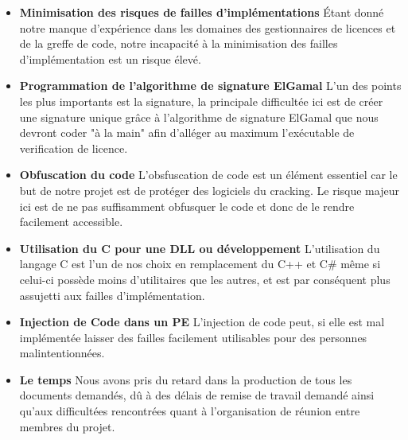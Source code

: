 \begin{itemize}
	\item \textbf{Minimisation des risques de failles d'implémentations} \newline
	Étant donné notre manque d'expérience dans les domaines des gestionnaires de licences
	et de la greffe de code, notre incapacité à la minimisation des failles d'implémentation est un risque élevé.\newline
	
	\item \textbf{Programmation de l'algorithme de signature ElGamal} \newline
	L'un des points les plus importants est la signature, la principale difficultée ici est de créer une signature unique grâce à l'algorithme de signature ElGamal que nous devront coder "à la main" afin d'alléger au maximum l'exécutable de verification de licence.	\newline
	
	\item \textbf{Obfuscation du code} \newline
	L'obsfuscation de code est un élément essentiel car le but de notre projet est de protéger des logiciels du cracking. Le risque majeur ici est de ne pas suffisamment obfusquer le code et donc de le rendre facilement accessible.\newline
	
	\item \textbf{Utilisation du C pour une DLL ou développement} \newline
	L'utilisation du langage C est l'un de nos choix en remplacement du C++ et C\# même si celui-ci possède moins d'utilitaires que les autres, et est par conséquent plus assujetti aux failles d'implémentation.\newline
	
	\item \textbf{Injection de Code dans un PE} \newline
	L'injection de code peut, si elle est mal implémentée laisser des failles facilement utilisables pour des personnes malintentionnées.\newline
	
	\item \textbf{Le temps} \newline
	Nous avons pris du retard dans la production de tous les documents demandés, dû à des délais de remise de travail demandé ainsi qu'aux 
	difficultées rencontrées quant à l'organisation de réunion entre membres du projet.\newline
\end{itemize}

